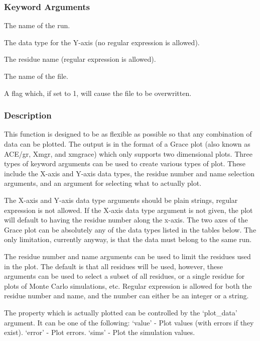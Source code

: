 \subsubsection{Keyword Arguments}

  The name of the run.

  The data type for the Y-axis (no regular expression is allowed).

  The residue name (regular expression is allowed).

  The name of the file.

  A flag which, if set to 1, will cause the file to be overwritten.

\subsubsection{Description}

This function is designed to be as flexible as possible so that any combination of data can
be plotted.  The output is in the format of a Grace plot (also known as ACE/gr, Xmgr, and
xmgrace) which only supports two dimensional plots.  Three types of keyword arguments can
be used to create various types of plot.  These include the X-axis and Y-axis data types,
the residue number and name selection arguments, and an argument for selecting what to
actually plot.

The X-axis and Y-axis data type arguments should be plain strings, regular expression is not
allowed.  If the X-axis data type argument is not given, the plot will default to having the
residue number along the x-axis.  The two axes of the Grace plot can be absolutely any of
the data types listed in the tables below.  The only limitation, currently anyway, is that
the data must belong to the same run.

The residue number and name arguments can be used to limit the residues used in the plot.
The default is that all residues will be used, however, these arguments can be used to
select a subset of all residues, or a single residue for plots of Monte Carlo simulations,
etc.  Regular expression is allowed for both the residue number and name, and the number can
either be an integer or a string.

The property which is actually plotted can be controlled by the `plot\_data' argument.  It
can be one of the following:
    `value' - Plot values (with errors if they exist).
    `error' - Plot errors.
    `sims'   - Plot the simulation values.


